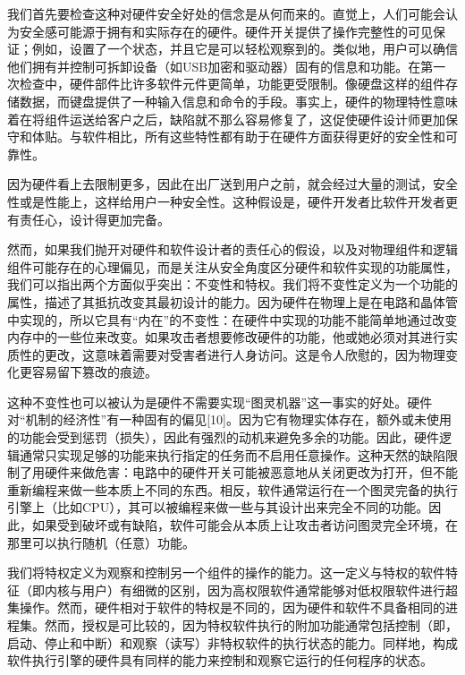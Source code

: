 我们首先要检查这种对硬件安全好处的信念是从何而来的。直觉上，人们可能会认为安全感可能源于拥有和实际存在的硬件。硬件开关提供了操作完整性的可见保证；例如，设置了一个状态，并且它是可以轻松观察到的。类似地，用户可以确信他们拥有并控制可拆卸设备（如USB加密和驱动器）固有的信息和功能。在第一次检查中，硬件部件比许多软件元件更简单，功能更受限制。像硬盘这样的组件存储数据，而键盘提供了一种输入信息和命令的手段。事实上，硬件的物理特性意味着在将组件运送给客户之后，缺陷就不那么容易修复了，这促使硬件设计师更加保守和体贴。与软件相比，所有这些特性都有助于在硬件方面获得更好的安全性和可靠性。

\begin{tcolorbox}[title={个人理解}]
    因为硬件看上去限制更多，因此在出厂送到用户之前，就会经过大量的测试，安全性或是性能上，这样给用户一种安全性。这种假设是，硬件开发者比软件开发者更有责任心，设计得更加完备。
\end{tcolorbox}
然而，如果我们抛开对硬件和软件设计者的责任心的假设，以及对物理组件和逻辑组件可能存在的心理偏见，而是关注从安全角度区分硬件和软件实现的功能属性，我们可以指出两个方面似乎突出：不变性和特权。我们将不变性定义为一个功能的属性，描述了其抵抗改变其最初设计的能力。因为硬件在物理上是在电路和晶体管中实现的，所以它具有“内在”的不变性：在硬件中实现的功能不能简单地通过改变内存中的一些位来改变。如果攻击者想要修改硬件的功能，他或她必须对其进行实质性的更改，这意味着需要对受害者进行人身访问。这是令人欣慰的，因为物理变化更容易留下篡改的痕迹。

这种不变性也可以被认为是硬件不需要实现“图灵机器”这一事实的好处。硬件对“机制的经济性”有一种固有的偏见[10]。因为它有物理实体存在，额外或未使用的功能会受到惩罚（损失），因此有强烈的动机来避免多余的功能。因此，硬件逻辑通常只实现足够的功能来执行指定的任务而不启用任意操作。这种天然的缺陷限制了用硬件来做危害：电路中的硬件开关可能被恶意地从关闭更改为打开，但不能重新编程来做一些本质上不同的东西。相反，软件通常运行在一个图灵完备的执行引擎上（比如CPU），其可以被编程来做一些与其设计出来完全不同的功能。因此，如果受到破坏或有缺陷，软件可能会从本质上让攻击者访问图灵完全环境，在那里可以执行随机（任意）功能。

我们将特权定义为观察和控制另一个组件的操作的能力。这一定义与特权的软件特征（即内核与用户）有细微的区别，因为高权限软件通常能够对低权限软件进行超集操作。然而，硬件相对于软件的特权是不同的，因为硬件和软件不具备相同的进程集。然而，授权是可比较的，因为特权软件执行的附加功能通常包括控制（即，启动、停止和中断）和观察（读写）非特权软件的执行状态的能力。同样地，构成软件执行引擎的硬件具有同样的能力来控制和观察它运行的任何程序的状态。

